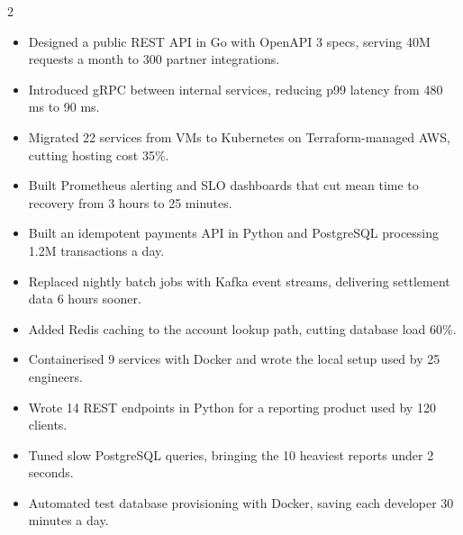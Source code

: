 \documentclass[10pt,a4paper,withhyper]{altacv}
\begin{document}


\makecvheader


\begin{paracol}{2}

\begin{itemize}
\item Designed a public REST API in Go with OpenAPI 3 specs, serving 40M requests a month to 300 partner integrations. %
\item Introduced gRPC between internal services, reducing p99 latency from 480 ms to 90 ms. %
\item Migrated 22 services from VMs to Kubernetes on Terraform-managed AWS, cutting hosting cost 35\%. %
\item Built Prometheus alerting and SLO dashboards that cut mean time to recovery from 3 hours to 25 minutes. %
\end{itemize}

\divider

\begin{itemize}
\item Built an idempotent payments API in Python and PostgreSQL processing 1.2M transactions a day. %
\item Replaced nightly batch jobs with Kafka event streams, delivering settlement data 6 hours sooner. %
\item Added Redis caching to the account lookup path, cutting database load 60\%. %
\item Containerised 9 services with Docker and wrote the local setup used by 25 engineers. %
\end{itemize}

\divider

\begin{itemize}
\item Wrote 14 REST endpoints in Python for a reporting product used by 120 clients. %
\item Tuned slow PostgreSQL queries, bringing the 10 heaviest reports under 2 seconds. %
\item Automated test database provisioning with Docker, saving each developer 30 minutes a day. %
\end{itemize}


\end{paracol}
\end{document}
